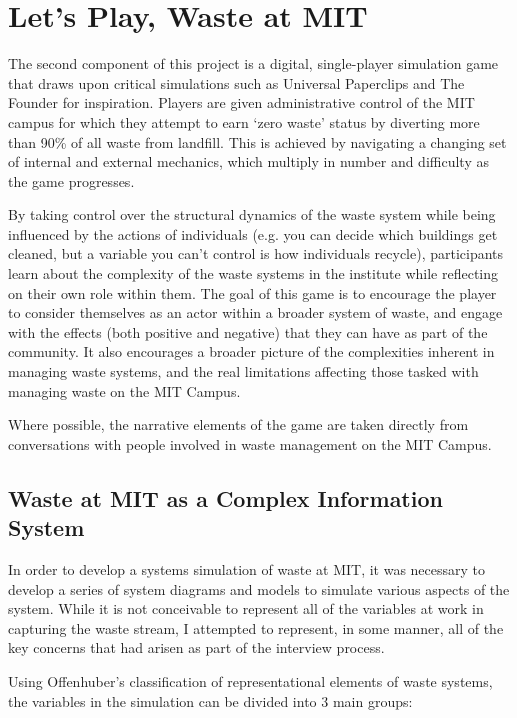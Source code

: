 \documentclass[nofonts,nols,justified,nobib]{tufte-book}
\begin{document}
\section*{Let's Play, Waste at MIT}

The second component of this project is a digital, single-player simulation game that draws upon critical simulations such as Universal Paperclips and The Founder for inspiration. Players are given administrative control of the MIT campus for which they attempt to earn `zero waste' status by diverting more than 90\% of all waste from landfill. This is achieved by navigating a changing set of internal and external mechanics, which multiply in number and difficulty as the game progresses.

By taking control over the structural dynamics of the waste system while being influenced by the actions of individuals (e.g. you can decide which buildings get cleaned, but a variable you can't control is how individuals recycle), participants learn about the complexity of the waste systems in the institute while reflecting on their own role within them. The goal of this game is to encourage the player to consider themselves as an actor within a broader system of waste, and engage with the effects (both positive and negative) that they can have as part of the community. It also encourages a broader picture of the complexities inherent in managing waste systems, and the real limitations affecting those tasked with managing waste on the MIT Campus.

Where possible, the narrative elements of the game are taken directly from conversations with people involved in waste management on the MIT Campus.

\subsection*{Waste at MIT as a Complex Information System}

In order to develop a systems simulation of waste at MIT, it was necessary to develop a series of system diagrams and models to simulate various aspects of the system. While it is not conceivable to represent all of the variables at work in capturing the waste stream, I attempted to represent, in some manner, all of the key concerns that had arisen as part of the interview process. 

Using Offenhuber's classification of representational elements of waste systems, the variables in the simulation can be divided into 3 main groups:
\end{document}
